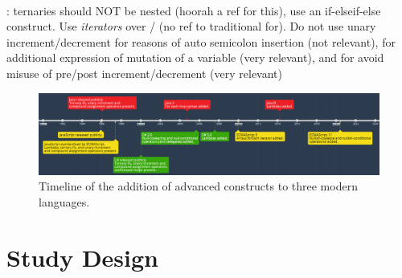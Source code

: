 \documentclass{article}
\begin{document}
\\
\cite{airbnbJSStyle}: ternaries should NOT be nested (hoorah a ref for this), use an if-elseif-else construct. Use \emph{iterators} over / (no ref to traditional for). Do not use unary increment/decrement for reasons of auto semicolon insertion (not relevant), for additional expression of mutation of a variable (very relevant), and for avoid misuse of pre/post increment/decrement (very relevant)
\\
\begin{landscape}
    \begin{figure}[htbp]
        \centering
        \vspace{2in}
        \includegraphics[width=1.5\textheight]{timeline}
        \caption{Timeline of the addition of advanced constructs to three modern languages.}
        \label{fig:timeline}
    \end{figure}
\end{landscape}
\newpage
\section{Study Design}
\end{document}
